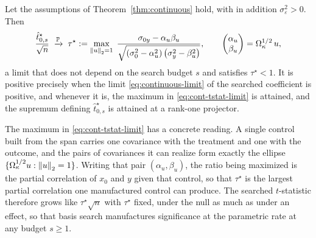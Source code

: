 \begin{theorem}\label{thm:continuous-tstat}
Let the assumptions of Theorem~\ref{thm:continuous} hold, with in
addition $\sigma_\varepsilon^2 > 0$. Then
\begin{equation}\label{eq:cont-tstat-limit}
        \frac{\hat t_{0,s}^\star}{\sqrt n}
        \;\xrightarrow{\mathbb{P}}\;
        \tau^\star
        :=
        \max_{\left\lVert u \right\rVert_2 = 1}\;
        \frac{\sigma_{0y} - \alpha_u \beta_u}
        {\sqrt{\left(\sigma_0^2 - \alpha_u^2\right)
        \left(\sigma_y^2 - \beta_u^2\right)}},
        \qquad
        \begin{pmatrix} \alpha_u \\ \beta_u \end{pmatrix}
        = \Omega_\kappa^{1/2}\, u,
\end{equation}
a limit that does not depend on the search budget $s$ and satisfies
$\tau^\star < 1$. It is positive precisely when the limit
\eqref{eq:continuous-limit} of the searched coefficient is positive, and
whenever it is, the maximum in \eqref{eq:cont-tstat-limit} is attained,
and the supremum defining $\hat t_{0,s}^\star$ is attained at a rank-one
projector.
\end{theorem}

\begin{remark}
\label{rem:cont-tstat-rankone}
The maximum in \eqref{eq:cont-tstat-limit} has a concrete reading. A
single control built from the span carries one covariance with the
treatment and one with the outcome, and the pairs of covariances it can
realize form exactly the ellipse
$\{\Omega_\kappa^{1/2} u : \left\lVert u \right\rVert_2 = 1\}$. Writing that pair
$(\alpha_u, \beta_u)$, the ratio being maximized is the partial
correlation of $x_0$ and $y$ given that control, so that $\tau^\star$ is
the largest partial correlation one manufactured control can produce. The
searched $t$-statistic therefore grows like $\tau^\star \sqrt n$ with
$\tau^\star$ fixed, under the null as much as under an effect, so that
basis search manufactures significance at the parametric rate at any
budget $s \ge 1$.
\end{remark}

